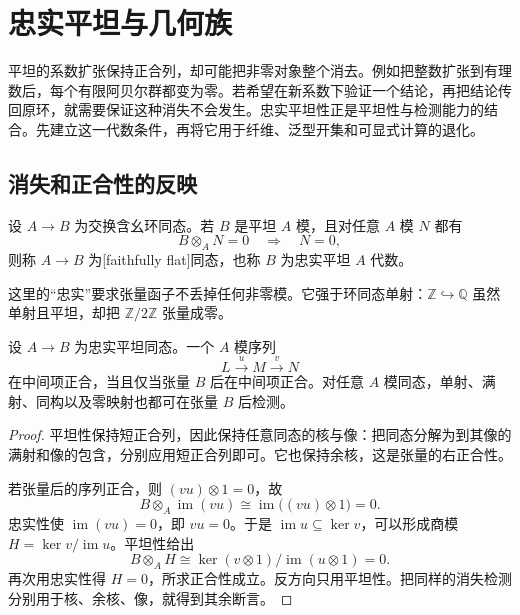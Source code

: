 
% 
% 
% 

\section{忠实平坦与几何族}
\label{g5:sec:0604}

平坦的系数扩张保持正合列，却可能把非零对象整个消去。例如把整数扩张到有理数后，每个有限阿贝尔群都变为零。若希望在新系数下验证一个结论，再把结论传回原环，就需要保证这种消失不会发生。忠实平坦性正是平坦性与检测能力的结合。先建立这一代数条件，再将它用于纤维、泛型开集和可显式计算的退化。

\subsection{消失和正合性的反映}
\label{g5:subsec:0604:01}

\begin{definition}\label{g5:def:faithfully-flat-algebra}
	设 \(A\to B\) 为交换含幺环同态。若 \(B\) 是平坦 \(A\) 模，且对任意 \(A\) 模 \(N\) 都有
	\[
		B\otimes_A N=0\quad\Longrightarrow\quad N=0,
	\]
	则称 \(A\to B\) 为[faithfully flat]同态，也称 \(B\) 为忠实平坦 \(A\) 代数。
\end{definition}

这里的“忠实”要求张量函子不丢掉任何非零模。它强于环同态单射：\(\mathbb Z\hookrightarrow\mathbb Q\) 虽然单射且平坦，却把 \(\mathbb Z/2\mathbb Z\) 张量成零。

\begin{proposition}\label{g5:prop:faithful-flat-reflects-exactness}
	设 \(A\to B\) 为忠实平坦同态。一个 \(A\) 模序列
	\[
		L\xrightarrow{u}M\xrightarrow{v}N
	\]
	在中间项正合，当且仅当张量 \(B\) 后在中间项正合。对任意 \(A\) 模同态，单射、满射、同构以及零映射也都可在张量 \(B\) 后检测。
\end{proposition}
\begin{proof}
	平坦性保持短正合列，因此保持任意同态的核与像：把同态分解为到其像的满射和像的包含，分别应用短正合列即可。它也保持余核，这是张量的右正合性。

	若张量后的序列正合，则 \((vu)\otimes1=0\)，故
	\[
		B\otimes_A\operatorname{im}(vu)
		\cong\operatorname{im}\bigl((vu)\otimes1\bigr)=0.
	\]
	忠实性使 \(\operatorname{im}(vu)=0\)，即 \(vu=0\)。于是 \(\operatorname{im}u\subseteq\ker v\)，可以形成商模
	\(H=\ker v/\operatorname{im}u\)。平坦性给出
	\[
		B\otimes_A H
		\cong\ker(v\otimes1)/\operatorname{im}(u\otimes1)=0.
	\]
	再次用忠实性得 \(H=0\)，所求正合性成立。反方向只用平坦性。把同样的消失检测分别用于核、余核、像，就得到其余断言。
\end{proof}

